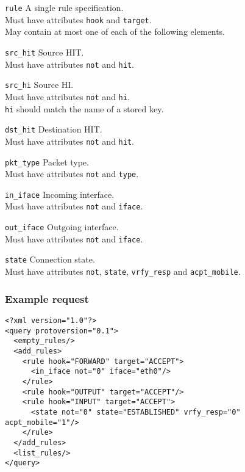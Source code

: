 \documentclass[a4paper,titlepage]{article}
\begin{document}
\begin{description}
\item \texttt{rule} A single rule specification. \\
        Must have attributes \texttt{hook} and \texttt{target}. \\
        May contain at most one of each of the following elements.
\item \texttt{src\_hit} Source HIT. \\
        Must have attributes \texttt{not} and \texttt{hit}.
\item \texttt{src\_hi} Source HI. \\
        Must have attributes \texttt{not} and \texttt{hi}. \\
        \texttt{hi} should match the name of a stored key.
\item \texttt{dst\_hit} Destination HIT. \\
        Must have attributes \texttt{not} and \texttt{hit}.
\item \texttt{pkt\_type} Packet type. \\
        Must have attributes \texttt{not} and \texttt{type}.
\item \texttt{in\_iface} Incoming interface. \\
        Must have attributes \texttt{not} and \texttt{iface}.
\item \texttt{out\_iface} Outgoing interface. \\
        Must have attributes \texttt{not} and \texttt{iface}.
\item \texttt{state} Connection state. \\
        Must have attributes \texttt{not}, \texttt{state}, \texttt{vrfy\_resp} and \texttt{acpt\_mobile}.
\end{description}

\subsubsection*{Example request}

\begin{verbatim}
<?xml version="1.0"?>
<query protoversion="0.1">
  <empty_rules/>
  <add_rules>
    <rule hook="FORWARD" target="ACCEPT">
      <in_iface not="0" iface="eth0"/>
    </rule>
    <rule hook="OUTPUT" target="ACCEPT"/>
    <rule hook="INPUT" target="ACCEPT">
      <state not="0" state="ESTABLISHED" vrfy_resp="0" acpt_mobile="1"/>
    </rule>
  </add_rules>
  <list_rules/>
</query>
\end{verbatim}
\end{document}
